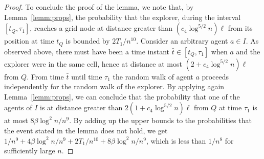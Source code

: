 \documentclass[11pt]{article}
\begin{document}
\begin{proof}
To conclude the proof of the lemma, we note that, by
Lemma~\ref{lemm:props}, the probability that
the explorer, during the interval $[t_Q, \tau_1]$,
reaches a grid node at distance greater than $(c_4 \log^{5/2} n) \ell$
from its position at time $t_Q$ is bounded by $2 T_1 / n^{10}$.
Consider an arbitrary agent $a \in I$. As observed above,
there must have been a time instant $\bar{t} \in [t_Q, \tau_1]$ when
$a$ and the explorer were in the same cell, hence at distance at most
$(2 + c_4 \log^{5/2} n) \ell$ from $Q$.  From time $\bar{t}$ until
time $\tau_1$ the random walk of agent $a$ proceeds independently for
the random walk of the explorer.  By applying again
Lemma~\ref{lemm:props}, we can conclude that the probability that one
of the agents of $I$ is at distance greater than $2 (1 + c_4 \log^{5/2} n) \ell$
from $Q$ at time $\tau_1$ is at most $8 \beta \log^2 n / n^9$.
By adding up the upper bounds to the probabilities that the event stated
in the lemma does not hold, we get
$1/n^9 + 4\beta \log^2 n/n^9 + 2 T_1 / n^{10} + 8 \beta \log^2 n / n^9$,
which is less than $1/n^8$ for sufficiently large $n$.
\end{proof}
\end{document}
